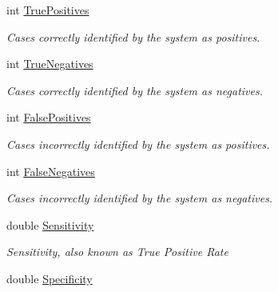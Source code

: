\begin{DoxyCompactItemize}
int \hyperlink{class_crowdsourcing_project_1_1_statistics_1_1_confusion_matrix_ae1776127573af2d851e6102bb71acc30}{True\+Positives}
\begin{DoxyCompactList}\small\item\em Cases correctly identified by the system as positives. \end{DoxyCompactList}\item 
int \hyperlink{class_crowdsourcing_project_1_1_statistics_1_1_confusion_matrix_a76af45bf60135f1f3d6cf64392be49c8}{True\+Negatives}
\begin{DoxyCompactList}\small\item\em Cases correctly identified by the system as negatives. \end{DoxyCompactList}\item 
int \hyperlink{class_crowdsourcing_project_1_1_statistics_1_1_confusion_matrix_accb022837853f2f22fcd610aa5379c0e}{False\+Positives}
\begin{DoxyCompactList}\small\item\em Cases incorrectly identified by the system as positives. \end{DoxyCompactList}\item 
int \hyperlink{class_crowdsourcing_project_1_1_statistics_1_1_confusion_matrix_a6e681408fc24887a2f64f711de077fe6}{False\+Negatives}
\begin{DoxyCompactList}\small\item\em Cases incorrectly identified by the system as negatives. \end{DoxyCompactList}\item 
double \hyperlink{class_crowdsourcing_project_1_1_statistics_1_1_confusion_matrix_ac8c37fcc9f7bc87122cfb030ef4039a1}{Sensitivity}
\begin{DoxyCompactList}\small\item\em Sensitivity, also known as True Positive Rate \end{DoxyCompactList}\item 
double \hyperlink{class_crowdsourcing_project_1_1_statistics_1_1_confusion_matrix_a214f269cbfeb96d7e50f013fd8e64c5c}{Specificity}

\end{DoxyCompactItemize}
